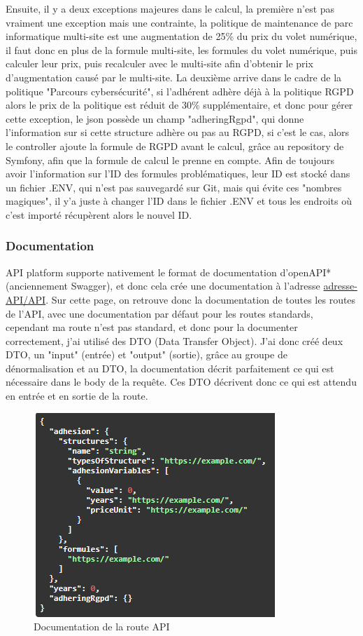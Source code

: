 \documentclass[a4paper,12pt]{report}
\begin{document}
Ensuite, il y a deux exceptions majeures dans le calcul, la première n'est pas vraiment une exception mais une contrainte, la politique de maintenance de parc informatique multi-site est une augmentation de 25\% du prix du volet numérique, il faut donc en plus de la formule multi-site, les formules du volet numérique, puis calculer leur prix, puis recalculer avec le multi-site afin d'obtenir le prix d'augmentation causé par le multi-site. La deuxième arrive dans le cadre de la politique "Parcours cybersécurité", si l'adhérent adhère déjà à la politique RGPD alors le prix de la politique est réduit de 30\% supplémentaire, et donc pour gérer cette exception, le json possède un champ "adheringRgpd", qui donne l'information sur si cette structure adhère ou pas au RGPD, si c'est le cas, alors le controller ajoute la formule de RGPD avant le calcul, grâce au repository de Symfony, afin que la formule de calcul le prenne en compte. Afin de toujours avoir l'information sur l'ID des formules problématiques, leur ID est stocké dans un fichier .ENV, qui n'est pas sauvegardé sur Git, mais qui évite ces "nombres magiques", il y'a juste à changer l'ID dans le fichier .ENV et tous les endroits où c'est importé récupèrent alors le nouvel ID.

\subsubsection{Documentation}

API platform supporte nativement le format de documentation d'openAPI* (anciennement Swagger), et donc cela crée une documentation à l'adresse \href{https://dev.API.numerobis.atd16.fr/API}{adresse-API/API}. Sur cette page, on retrouve donc la documentation de toutes les routes de l'API, avec une documentation par défaut pour les routes standards, cependant ma route n'est pas standard, et donc pour la documenter correctement, j'ai utilisé des DTO (Data Transfer Object). J'ai donc créé deux DTO, un "input" (entrée) et "output" (sortie), grâce au groupe de dénormalisation et au DTO, la documentation décrit parfaitement ce qui est nécessaire dans le body de la requête. Ces DTO décrivent donc ce qui est attendu en entrée et en sortie de la route.

\begin{figure}[ht]
    \centering
    \includegraphics[scale=0.8]{docSimulatorInput.png}
    \caption{Documentation de la route API}
    \label{fig:swagger-simulator-in}
\end{figure}
\end{document}
